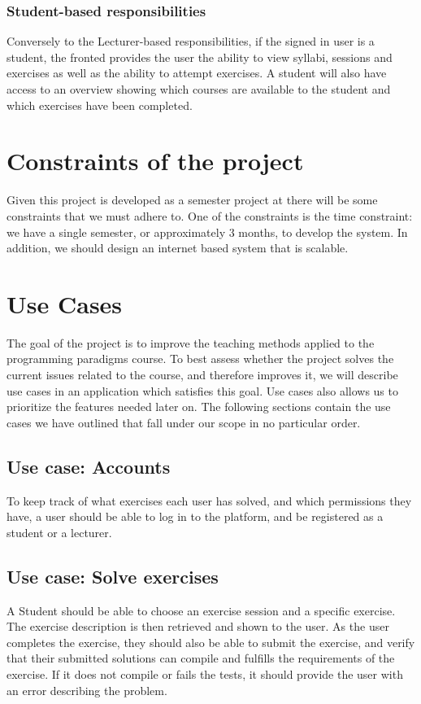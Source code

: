 \subsubsection*{Student-based responsibilities}
Conversely to the Lecturer-based responsibilities, if the signed in user is a student, the fronted provides the user the ability to view syllabi, sessions and exercises as well as the ability to attempt exercises. A student will also have access to an overview showing which courses are available to the student and which exercises have been completed.


\section*{Constraints of the project}
Given this project is developed as a semester project at \aau{} there will be some constraints that we must adhere to.
One of the constraints is the time constraint: we have a single semester, or approximately 3 months, to develop the system.
In addition, we should design an internet based system that is scalable.

\section*{Use Cases} \label{sec:use_cases}
The goal of the project is to improve the teaching methods applied to the programming paradigms course.
To best assess whether the project solves the current issues related to the course, and therefore improves it, we will describe use cases in an application which satisfies this goal.
Use cases also allows us to prioritize the features needed later on.
The following sections contain the use cases we have outlined that fall under our scope in no particular order.

\subsection*{Use case: Accounts}
To keep track of what exercises each user has solved, and which permissions they have, a user should be able to log in to the platform, and be registered as a student or a lecturer.

\subsection*{Use case: Solve exercises}
A Student should be able to choose an exercise session and a specific exercise. The exercise description is then retrieved and shown to the user.
As the user completes the exercise, they should also be able to submit the exercise, and verify that their submitted solutions can compile and fulfills the requirements of the exercise. If it does not compile or fails the tests, it should provide the user with an error describing the problem.

